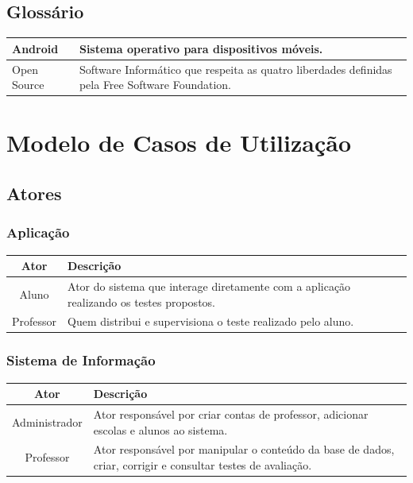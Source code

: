 \documentclass[a4paper]{article}
\begin{document}
		\subsection{Glossário}
			\begin{tabular}{|l|p{10cm}|}
				\hline Android & Sistema operativo para dispositivos móveis. \\ 
				\hline Open Source & Software Informático que respeita as quatro liberdades definidas pela Free Software Foundation. \\  	
				\hline 
			\end{tabular} 
		
		\newpage %
		\section{Modelo de Casos de Utilização}
			\subsection{Atores}
		
			\subsubsection{Aplicação}
				\begin{tabular}{|c|p{10cm}|}
					\hline Ator & Descrição \\ 
					\hline Aluno & Ator do sistema que interage diretamente com a aplicação realizando os testes propostos. \\ 
					\hline Professor & Quem distribui e supervisiona o teste realizado pelo aluno. \\ 
					\hline 
				\end{tabular} 
		
			\subsubsection{Sistema de Informação}	
				\begin{tabular}{|c|p{10cm}|}
					\hline Ator & Descrição \\ 
					\hline Administrador & Ator responsável por criar contas de professor, adicionar escolas e alunos ao sistema. \\ 
					\hline Professor & Ator responsável por manipular o conteúdo da base de dados, criar, corrigir e consultar testes de avaliação. \\ 
					\hline 
				\end{tabular} 				
	
\end{document}
